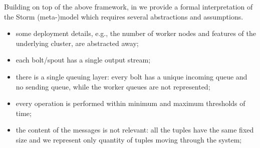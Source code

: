 Building on top of the above framework, in \cite{MBER16} we provide a formal interpretation of the Storm (meta-)model which requires several abstractions and assumptions.



\begin{itemize}
	\item some deployment details, e.g., the number of worker nodes and features of the underlying cluster, are abstracted away;
	\item each bolt/spout has a single output stream;
	\item %
	there is a single queuing layer: every bolt has a unique incoming queue and no sending queue, while the worker queues are not represented;
	\item every operation is performed within minimum and maximum thresholds of time;
	\item %
	the content of the messages is not relevant: all the tuples have the same fixed size and we represent only quantity of tuples moving through the system;
\end{itemize}


